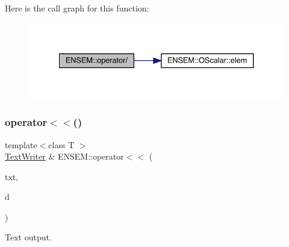 Here is the call graph for this function\+:\nopagebreak
\begin{figure}[H]
\begin{center}
\leavevmode
\includegraphics[width=334pt]{d8/d55/group__obsmatrix_gaa90c91fdbe2814bb15f1ac76012585d8_cgraph}
\end{center}
\end{figure}
\mbox{\label{group__obsmatrix_gacdc76da3bc2873feb9cad8323ea02e83}} 
\subsubsection{\texorpdfstring{operator$<$$<$()}{operator<<()}\hspace{0.1cm}{\footnotesize\ttfamily [1/2]}}
{\footnotesize\ttfamily template$<$class T $>$ \\
\mbox{\hyperlink{classENSEM_1_1TextWriter}{Text\+Writer}} \& E\+N\+S\+E\+M\+::operator$<$$<$ (\begin{DoxyParamCaption}\item[{\mbox{\hyperlink{classENSEM_1_1TextWriter}{Text\+Writer}} \&}]{txt,  }\item[{const \mbox{\hyperlink{classENSEM_1_1OMatrix}{O\+Matrix}}$<$ T $>$ \&}]{d }\end{DoxyParamCaption})\hspace{0.3cm}{\ttfamily [inline]}}



Text output. 

\mbox{\label{group__obsmatrix_ga62a405af58665d9bce46afb03abd8c90}} 
